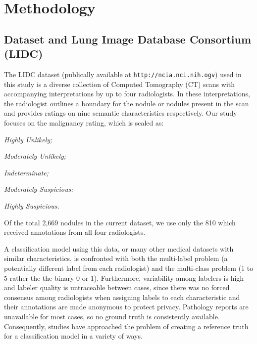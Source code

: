 \documentclass[]{spie}
\begin{document}
\section{Methodology}
\label{sec:methodology}
\subsection{Dataset and Lung Image Database Consortium (LIDC)}
The LIDC dataset (publically available at {\tt http://ncia.nci.nih.ogv}) used in this study is a diverse collection of Computed Tomography (CT) scans with accompanying interpretations by up to four radiologists\cite{Armato11}. In these interpretations, the radiologist outlines a boundary for the nodule or nodules present in the scan and provides ratings on nine semantic characteristics respectively. Our study focuses on the malignancy rating, which is scaled as:\begin{inparaenum}[1.]
\item \emph{Highly Unlikely;}
\item \emph{Moderately Unlikely;}
\item \emph{Indeterminate;}
\item \emph{Moderately Suspicious;}
\item \emph{Highly Suspicious.}
\end{inparaenum}
Of the total 2,669 nodules in the current dataset, we use only the 810 which received annotations from all four radiologists.

A classification model using this data, or many other medical datasets with similar characteristics, is confronted with both the multi-label problem (a potentially different label from each radiologist) and the multi-class problem (1 to 5 rather the the binary 0 or 1). Furthermore, variability among labelers is high and labeler quality is untraceable between cases, since there was no forced consensus among radiologists when assigning labels to each characteristic and their annotations are made anonymous to protect privacy. Pathology reports are unavailable for most cases, so no ground truth is consistently available. Consequently, studies have approached the problem of creating a reference truth for a classification model in a variety of ways.

\end{document}

